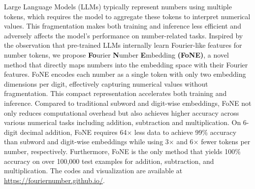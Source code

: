 

Large Language Models (LLMs) typically represent numbers using multiple tokens, which requires the model to aggregate these tokens to interpret numerical values. This fragmentation makes both training and inference less efficient and adversely affects the model's performance on number-related tasks. Inspired by the observation that pre-trained LLMs internally learn Fourier-like features for number tokens, we propose \textbf{Fo}urier \textbf{N}umber \textbf{E}mbedding \textbf{(FoNE)}, a novel method that directly maps numbers into the embedding space with their Fourier features. FoNE encodes each number as a single token with only two embedding dimensions per digit, effectively capturing numerical values without fragmentation. This compact representation accelerates both training and inference. Compared to traditional subword and digit-wise embeddings, FoNE not only reduces computational overhead but also achieves higher accuracy across various numerical tasks including addition, subtraction and multiplication. On 6-digit decimal addition, 
FoNE requires 64$\times$ less data to achieve 99\% accuracy than subword and digit-wise embeddings while using 3$\times$ and 6$\times$ fewer tokens per number, respectively. Furthermore, FoNE is the only method that yields 100\% accuracy on over 100,000 test examples for addition, subtraction, and multiplication.
\ifdefined\isarxiv
The codes and visualization are available at  \url{https://fouriernumber.github.io/}.
\fi